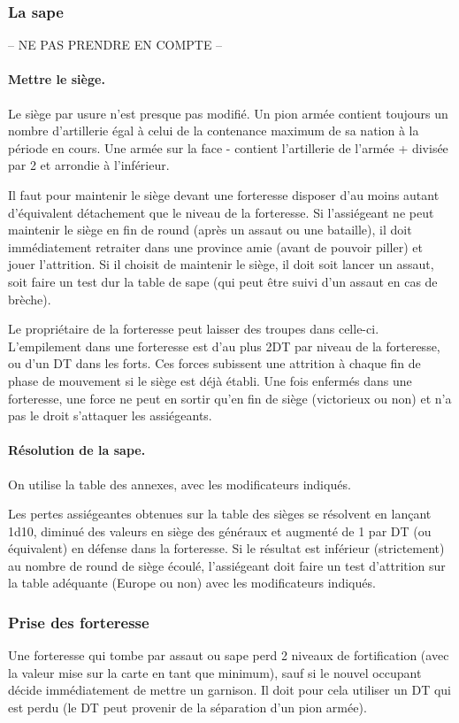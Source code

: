 \subsubsection{La sape}
-- NE PAS PRENDRE EN COMPTE --

\paragraph{Mettre le siège.}
Le siège par usure n'est presque pas modifié. Un pion armée  contient toujours 
un nombre d'artillerie égal à celui de la contenance maximum de sa nation à la période en cours.
Une armée sur la face - contient l'artillerie de l'armée + divisée par 2 et arrondie
à l'inférieur.

Il faut pour maintenir le siège devant une forteresse disposer d'au moins autant 
d'équivalent détachement que le niveau de la forteresse.
Si l'assiégeant ne peut maintenir le siège en fin de round (après un assaut ou une
bataille), il doit immédiatement retraiter dans une province amie (avant de pouvoir
piller) et jouer l'attrition. 
Si il choisit de maintenir le siège, il doit soit lancer un assaut, soit faire
un test dur la table de sape (qui peut être suivi d'un assaut en cas de brèche).

Le propriétaire de la forteresse peut laisser des troupes dans celle-ci.
L'empilement dans une forteresse est d'au plus 2DT par niveau de la
forteresse, ou d'un DT dans les forts. Ces forces subissent une attrition
à chaque fin de phase de mouvement si le siège est déjà
établi. Une fois enfermés dans une forteresse, une force ne peut 
en sortir qu'en fin de siège (victorieux ou non) et n'a pas le
droit s'attaquer les assiégeants.

\paragraph{Résolution de la sape.} On utilise la table des annexes,
avec les modificateurs indiqués.

Les pertes assiégeantes obtenues sur la table des sièges se résolvent
en lançant 1d10, diminué des valeurs en siège des généraux 
et augmenté de 1 par DT (ou équivalent) en défense dans la forteresse. 
Si le résultat est inférieur (strictement) au nombre de round
de siège écoulé, l'assiégeant doit faire un test d'attrition sur la table 
adéquante (Europe ou non) avec les modificateurs indiqués. 

\subsubsection{Prise des forteresse}
Une forteresse qui tombe par assaut ou sape perd 2 niveaux de
fortification (avec la valeur mise sur la carte en tant que minimum),
sauf si le nouvel occupant décide immédiatement de mettre un
garnison. Il doit pour cela utiliser un DT qui est perdu (le DT peut
provenir de la séparation d'un pion armée).

